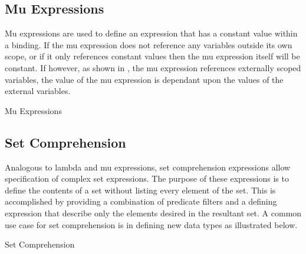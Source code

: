 \documentclass[letterpaper,10pt,draft]{book}
\begin{document}
\subsection{Mu Expressions}
   \label{sect:MuExpr}

Mu expressions are used to define an expression that has a constant value within
a binding.  If the mu expression does not reference any variables outside its own
scope, or if it only references constant values then the mu expression itself will
be constant.  If however, as shown in , the mu expression references
externally scoped variables, the value of the mu expression is dependant upon the
values of the external variables.

\begin{example}
\begin{minipage}[t]{0.49\linewidth}
   
\end{minipage}
\begin{minipage}[t]{0.49\linewidth}
   \azbox
   
\end{minipage}

   \caption{Mu Expressions}
   \label{ex:MuExpr}
\end{example}

\subsection{Set Comprehension}
   \label{sect:SetComp}

Analogous to lambda and mu expressions, set comprehension expressions allow specification
of complex set expressions.  The purpose of these expressions is to define the contents
of a set without listing every element of the set.  This is accomplished by providing
a combination of predicate filters and a defining expression that describe only
the elements desired in the resultant set.  A common use case for set comprehension
is in defining new data types as illustrated below.

\begin{example}
\begin{minipage}[t]{0.49\linewidth}
   
\end{minipage}
\begin{minipage}[t]{0.49\linewidth}
   \azed
   
\end{minipage}

   \caption{Set Comprehension}
   \label{ex:SetComp}
\end{example}
\end{document}
